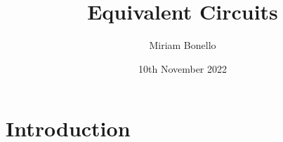 \documentclass[12pt, a4paper]{article}
\begin{document}
\justifying 
\title{Equivalent Circuits}
\author{Miriam Bonello}
\date{10th November 2022}

\maketitle 

\begin{abstract}
\end{abstract}

\section*{Introduction}\label{section-introduction}
\end{document}

